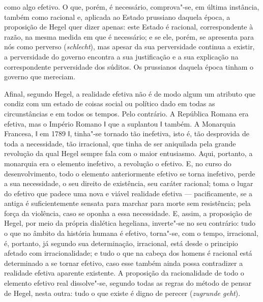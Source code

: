 como algo efetivo. O que, porém, é necessário, comprova"-se, em última
instância, também como racional e, aplicada ao Estado prussiano daquela
época, a proposição
de Hegel quer
dizer apenas: este Estado é racional, correspondente à razão, na mesma
medida em que é necessário; e se ele, porém, se apresenta para nós como
perverso (\emph{schlecht}), mas apesar da sua perversidade continua a
existir, a perversidade do governo encontra a sua justificação e a sua
explicação na correspondente perversidade dos súditos. Os prussianos
daquela época tinham o governo que mereciam.

Afinal,
segundo Hegel,
a realidade efetiva não é de modo algum um atributo que condiz com um
estado de coisas social ou político dado em todas as circunstâncias e em
todos os tempos. Pelo contrário. A República Romana era efetiva, mas o
Império Romano ǁ que a suplantou ǁ também. A Monarquia Francesa, ǁ em
1789 ǁ, tinha"-se tornado tão inefetiva, isto é, tão desprovida de toda a
necessidade, tão irracional, que tinha de ser aniquilada pela grande
revolução da qual
Hegel sempre
fala com o maior entusiasmo. Aqui, portanto, a monarquia era o elemento
inefetivo, a revolução o efetivo. E, no curso do desenvolvimento, todo o
elemento anteriormente efetivo se torna inefetivo, perde a sua
necessidade, o seu direito de existência, seu caráter racional; toma o
lugar do efetivo que padece uma nova e viável realidade efetiva ---
pacificamente, se a antiga é suficientemente sensata para marchar para
morte sem resistência; pela força da violência, caso se oponha a essa
necessidade. E, assim, a proposição
de Hegel, por
meio da própria dialética
hegeliana,
inverte"-se no seu contrário: tudo o que no âmbito da história humana é
efetivo, torna"-se, com o tempo, irracional, é, portanto, já segundo sua
determinação, irracional, está desde o principio afetado com
irracionalidade; e tudo o que na cabeça dos homens é racional está
determinado a se tornar efetivo, caso esse também ainda possa
contradizer a realidade efetiva aparente existente. A proposição da
racionalidade de todo o elemento efetivo real dissolve"-se, segundo todas
as regras do método de pensar
de Hegel,
nesta outra: tudo o que existe é digno de perecer (\emph{zugrunde
geht}).

